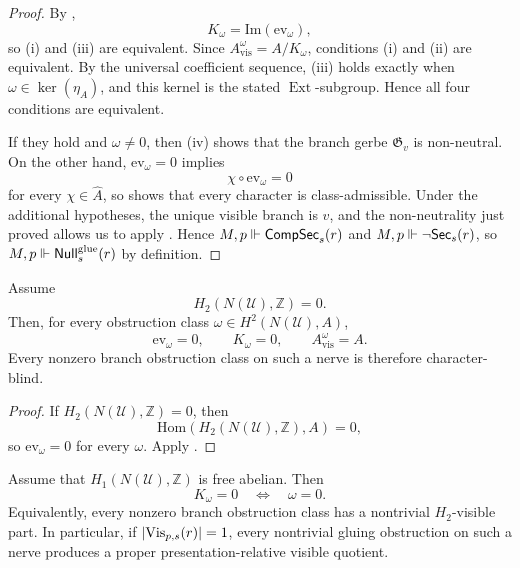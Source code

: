 \begin{proof}
By ,
\[
K_{\omega}=\mathrm{Im}(\mathrm{ev}_{\omega}),
\]
so \textup{(i)} and \textup{(iii)} are equivalent. Since $A_{\mathrm{vis}}^{\omega}=A/K_{\omega}$, conditions \textup{(i)} and \textup{(ii)} are equivalent. By the universal coefficient sequence, \textup{(iii)} holds exactly when $\omega\in\ker(\eta_A)$, and this kernel is the stated $\operatorname{Ext}$-subgroup. Hence all four conditions are equivalent.

If they hold and $\omega\neq 0$, then (iv) shows that the branch gerbe $\mathfrak G_v$ is non-neutral.
On the other hand, $\mathrm{ev}_{\omega}=0$ implies
\[
\chi\circ \mathrm{ev}_{\omega}=0
\]
for every $\chi\in\widehat A$, so  shows that every character is class-admissible.
Under the additional hypotheses, the unique visible branch is $v$, and the non-neutrality just proved allows us to apply . Hence $M,p\Vdash \mathsf{CompSec}_s(r)$ and $M,p\Vdash \neg\mathsf{Sec}_s(r)$, so $M,p\Vdash \mathsf{Null}^{\mathrm{glue}}_s(r)$ by definition.
\end{proof}

\begin{corollary}\label{cor:h2-vanishing-blindness}
Assume
\[
H_2(N(\mathcal U),\mathbb Z)=0.
\]
Then, for every obstruction class $\omega\in H^2(N(\mathcal U),A)$,
\[
\mathrm{ev}_{\omega}=0,
\qquad
K_{\omega}=0,
\qquad
A_{\mathrm{vis}}^{\omega}=A.
\]
Every nonzero branch obstruction class on such a nerve is therefore character-blind.
\end{corollary}

\begin{proof}
If $H_2(N(\mathcal U),\mathbb Z)=0$, then
\[
\mathrm{Hom}(H_2(N(\mathcal U),\mathbb Z),A)=0,
\]
so $\mathrm{ev}_{\omega}=0$ for every $\omega$. Apply .
\end{proof}

\begin{corollary}\label{cor:h1-free-no-blindness}
Assume that $H_1(N(\mathcal U),\mathbb Z)$ is free abelian. Then
\[
K_{\omega}=0
\quad\Longleftrightarrow\quad
\omega=0.
\]
Equivalently, every nonzero branch obstruction class has a nontrivial $H_2$-visible part. In particular, if $|\mathrm{Vis}_{p,s}(r)|=1$, every nontrivial gluing obstruction on such a nerve produces a proper presentation-relative visible quotient.
\end{corollary}

